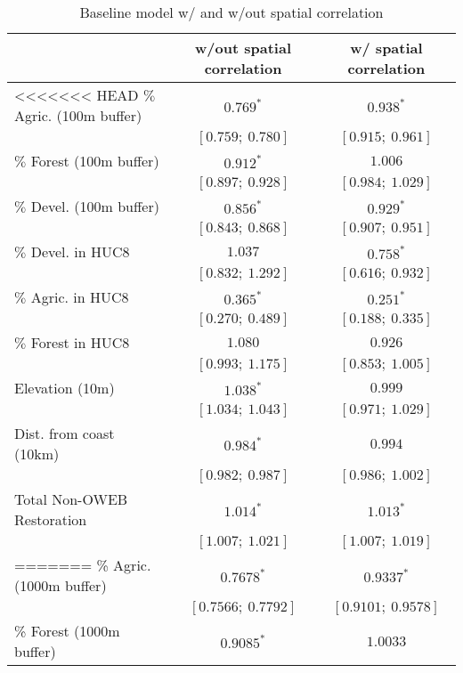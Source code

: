 
\begin{table}
\caption{Baseline model w/ and w/out spatial correlation}
\begin{center}
\begin{tabular}{l c c }
\hline
                           & w/out spatial correlation & w/ spatial correlation \\
\hline
<<<<<<< HEAD
$\%$  Agric. (100m buffer) & $0.769^{*}$       & $0.938^{*}$       \\
                           & $[0.759;\ 0.780]$ & $[0.915;\ 0.961]$ \\
$\%$  Forest (100m buffer) & $0.912^{*}$       & $1.006$           \\
                           & $[0.897;\ 0.928]$ & $[0.984;\ 1.029]$ \\
$\%$  Devel. (100m buffer) & $0.856^{*}$       & $0.929^{*}$       \\
                           & $[0.843;\ 0.868]$ & $[0.907;\ 0.951]$ \\
$\%$  Devel. in HUC8       & $1.037$           & $0.758^{*}$       \\
                           & $[0.832;\ 1.292]$ & $[0.616;\ 0.932]$ \\
$\%$  Agric. in HUC8       & $0.365^{*}$       & $0.251^{*}$       \\
                           & $[0.270;\ 0.489]$ & $[0.188;\ 0.335]$ \\
$\%$  Forest in HUC8       & $1.080$           & $0.926$           \\
                           & $[0.993;\ 1.175]$ & $[0.853;\ 1.005]$ \\
Elevation (10m)            & $1.038^{*}$       & $0.999$           \\
                           & $[1.034;\ 1.043]$ & $[0.971;\ 1.029]$ \\
Dist. from coast (10km)    & $0.984^{*}$       & $0.994$           \\
                           & $[0.982;\ 0.987]$ & $[0.986;\ 1.002]$ \\
Total Non-OWEB Restoration & $1.014^{*}$       & $1.013^{*}$       \\
                           & $[1.007;\ 1.021]$ & $[1.007;\ 1.019]$ \\
=======
\%  Agric. (1000m buffer) & $0.7678^{*}$        & $0.9337^{*}$        \\
                           & $[0.7566;\ 0.7792]$ & $[0.9101;\ 0.9578]$ \\
\%  Forest (1000m buffer) & $0.9085^{*}$        & $1.0033$            \\

\end{tabular}
\end{center}
\end{table}
